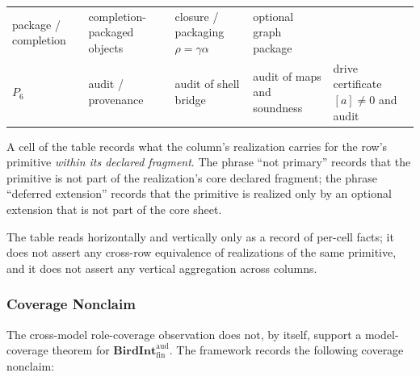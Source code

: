 \documentclass[11pt]{article}
\theoremstyle{definition}
\begin{document}
\begin{longtable}[]{@{}lllll@{}}
\begin{minipage}[t]{0.17\columnwidth}
package / completion\strut
\end{minipage} & \begin{minipage}[t]{0.19\columnwidth}\raggedright
completion-packaged objects\strut
\end{minipage} & \begin{minipage}[t]{0.23\columnwidth}\raggedright
closure / packaging \(\rho=\gamma\alpha\)\strut
\end{minipage} & \begin{minipage}[t]{0.17\columnwidth}\raggedright
optional graph package\strut
\end{minipage}\tabularnewline
\begin{minipage}[t]{0.10\columnwidth}\raggedright
\(P_{6}\)\strut
\end{minipage} & \begin{minipage}[t]{0.17\columnwidth}\raggedright
audit / provenance\strut
\end{minipage} & \begin{minipage}[t]{0.19\columnwidth}\raggedright
audit of shell bridge\strut
\end{minipage} & \begin{minipage}[t]{0.23\columnwidth}\raggedright
audit of maps and soundness\strut
\end{minipage} & \begin{minipage}[t]{0.17\columnwidth}\raggedright
drive certificate \([a]\neq 0\) and audit\strut
\end{minipage}\tabularnewline
\bottomrule
\end{longtable}

A cell of the table records what the column's realization carries for the row's primitive \emph{within its declared fragment}. The phrase ``not primary'' records that the primitive is not part of the realization's core declared fragment; the phrase ``deferred extension'' records that the primitive is realized only by an optional extension that is not part of the core sheet.

The table reads horizontally and vertically only as a record of per-cell facts; it does not assert any cross-row equivalence of realizations of the same primitive, and it does not assert any vertical aggregation across columns.

\subsubsection{Coverage Nonclaim}

The cross-model role-coverage observation does not, by itself, support a model-coverage theorem for \(\mathbf{BirdInt}^{\mathrm{aud}}_{\mathrm{fin}}\). The framework records the following coverage nonclaim:
\end{document}
